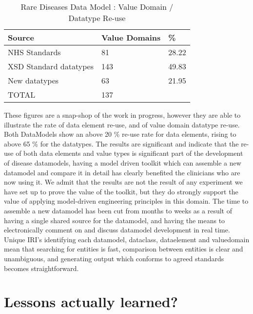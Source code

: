 \begin{table}[h]
	\caption{Rare Diseases Data Model : Value Domain / Datatype Re-use}
	\begin{tabular}{ p{2.8cm} p{1.8cm}  p{1.8cm}      }  %
		\hline
		Source & Value Domains& \%  \\ 
		\hline
		NHS Standards & 81 & 28.22\\
		XSD Standard datatypes & 143 & 49.83 \\
		New datatypes & 63 & 21.95 \\
		\hline
		TOTAL & 137
	\end{tabular}
\end{table}

These figures are a snap-shop of the work in progress, however they are able to illustrate the rate of data element re-use, and of value domain datatype re-use. Both DataModels show an above 20 \% re-use rate for data elements, rising to above 65 \% for the datatypes. The results are significant and indicate that the re-use of both data elements and value types is significant part of the development of disease datamodels, having a model driven toolkit which can assemble a new datamodel and compare it in detail has clearly benefited the clinicians who are now using it.  We admit that the results are not the result of any experiment we have set up to prove the value of the toolkit, but they do strongly support the value of applying model-driven engineering principles in this domain. The time to assemble a new datamodel has been cut from months to weeks as a result of having a single shared source for the datamodel, and having the means to electronically comment on and discuss datamodel development in real time. Unique IRI's identifying each datamodel, dataclass, dataelement and valuedomain mean that searching for entities is fast, comparison between entities is clear and unambiguous, and generating output which conforms to agreed standards becomes straightforward.

 
\section{Lessons actually learned?}

